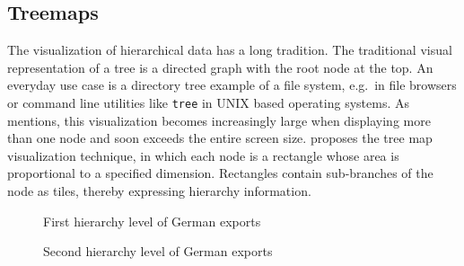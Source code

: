 \subsection{Treemaps}
The visualization of hierarchical data has a long tradition.
The traditional visual representation of a tree is a directed graph with the root node at the top.
An everyday use case is a directory tree example of a file system, e.g.\ in file browsers or command line utilities like \texttt{tree} in UNIX based operating systems.
As \textcite{Shneiderman1992} mentions, this visualization becomes increasingly large when displaying more than one node and soon exceeds the entire screen size.
\textcite{Johnson1991} proposes the tree map visualization technique, in which each node is a rectangle whose area is proportional to a specified dimension.
Rectangles contain sub-branches of the node as tiles, thereby expressing hierarchy information.
\begin{figure}[h]
    \centering
    \caption{First hierarchy level of German exports}\label{fig:theory:treemap-german-exports-1}
\end{figure}

\begin{figure}[h]
    \centering
    \caption{Second hierarchy level of German exports}\label{fig:theory:treemap-german-exports-2}
\end{figure}

